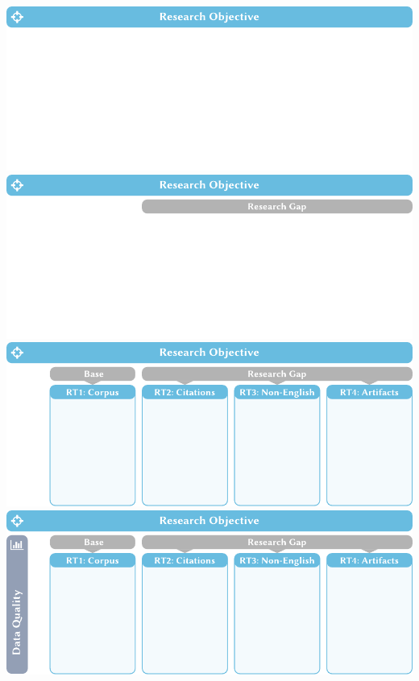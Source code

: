\documentclass[en,16:9,smallfoot]{sdqbeamer}
\begin{document}
   \begin{frame}[plain]
       \begin{overprint}
            \centering\includegraphics[width=\textwidth]{imgs/objective_grid_and_contrib_0}
            \centering\includegraphics[width=\textwidth]{imgs/objective_grid_and_contrib_conclusion_rts_0}  %
            \centering\includegraphics[width=\textwidth]{imgs/objective_grid_and_contrib_2}
            \centering\includegraphics[width=\textwidth]{imgs/objective_grid_and_contrib_3}

\end{overprint}
\end{frame}
\end{document}
